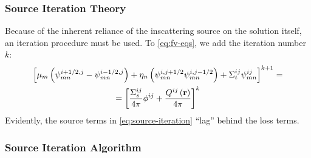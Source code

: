 \begin{frame}
  \frametitle{Source Iteration Theory}
  Because of the inherent reliance of the inscattering source on the solution itself, an iteration procedure must be used.
  To \cref{eq:fv-eqs}, we add the iteration number $k$:
  \begin{multline}\label{eq:source-iteration}
    \left[ \mu_{m}\left(\psi_{mn}^{i+1/2,j}-\psi_{mn}^{i-1/2,j}\right)+\eta_{n}\left(\psi_{mn}^{i,j+1/2}\-\psi_{mn}^{i,j-1/2}\right) + \Sigma_t ^{ij}\psi_{mn}^{ij}\right]^{k+1} =\\=\left[ \frac{\Sigma_s^{ij}}{4\pi}\phi^{ij} + \frac{Q^{ij}\left(\mathbf{r}\right)}{4\pi}\right]^k
  \end{multline}
  Evidently, the source terms in \cref{eq:source-iteration} ``lag'' behind the loss terms.
\end{frame}

\begin{frame}
  \frametitle{Source Iteration Algorithm}
  

\end{frame}

